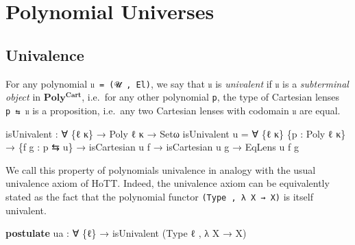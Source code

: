 \documentclass[
  11pt,
  oneside,
  article]{memoir}
\newenvironment{Shaded}{}{}
\newcommand{\KeywordTok}[1]{\textcolor[rgb]{0.00,0.44,0.13}{\textbf{#1}}}
\newcommand{\NormalTok}[1]{#1}
\newcommand{\OtherTok}[1]{\textcolor[rgb]{0.00,0.44,0.13}{#1}}
\theoremstyle{definition}
\theoremstyle{plain}
\newcommand{\0}{\textsf{0}}
\newcommand{\1}{\tn{\textsf{1}}}
\begin{document}
\chapter{Polynomial Universes}\label{polynomial-universes}

\section{Univalence}\label{univalence}

For any polynomial \texttt{𝔲\ =\ (𝓤\ ,\ El)}, we say that \texttt{𝔲} is
\emph{univalent} if \texttt{𝔲} is a \emph{subterminal object} in
\(\mathbf{Poly^{Cart}}\), i.e.~for any other polynomial \texttt{p}, the
type of Cartesian lenses \texttt{p\ ⇆\ 𝔲} is a proposition, i.e.~any two
Cartesian lenses with codomain \texttt{𝔲} are equal.

\begin{Shaded}
\begin{Highlighting}[]
\NormalTok{isUnivalent }\OtherTok{:} \OtherTok{∀} \OtherTok{\{}\NormalTok{ℓ κ}\OtherTok{\}} \OtherTok{→}\NormalTok{ Poly ℓ κ }\OtherTok{→}\NormalTok{ Setω}
\NormalTok{isUnivalent u }\OtherTok{=} 
    \OtherTok{∀} \OtherTok{\{}\NormalTok{ℓ\textquotesingle{} κ\textquotesingle{}}\OtherTok{\}} \OtherTok{\{}\NormalTok{p }\OtherTok{:}\NormalTok{ Poly ℓ\textquotesingle{} κ\textquotesingle{}}\OtherTok{\}}
      \OtherTok{→} \OtherTok{\{}\NormalTok{f g }\OtherTok{:}\NormalTok{ p ⇆ u}\OtherTok{\}}
      \OtherTok{→}\NormalTok{ isCartesian u f}
      \OtherTok{→}\NormalTok{ isCartesian u g}
      \OtherTok{→}\NormalTok{ EqLens u f g}
    
\end{Highlighting}
\end{Shaded}

We call this property of polynomials univalence in analogy with the
usual univalence axiom of HoTT. Indeed, the univalence axiom can be
equivalently stated as the fact that the polynomial functor
\texttt{(Type\ ,\ λ\ X\ →\ X)} is itself univalent.

\begin{Shaded}
\begin{Highlighting}[]
\KeywordTok{postulate}
\NormalTok{    ua }\OtherTok{:} \OtherTok{∀} \OtherTok{\{}\NormalTok{ℓ}\OtherTok{\}} \OtherTok{→}\NormalTok{ isUnivalent }\OtherTok{(}\NormalTok{Type ℓ , }\OtherTok{λ}\NormalTok{ X }\OtherTok{→}\NormalTok{ X}\OtherTok{)}
\end{Highlighting}
\end{Shaded}
\end{document}
